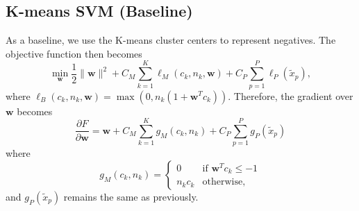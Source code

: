 \documentclass[12pt]{article}
\newcommand{\bw}{\mathbf{w}}
\newcommand{\tx}{\tilde{x}}
\begin{document}
\subsection{K-means SVM (Baseline)}
As a baseline, we use the K-means cluster centers to represent negatives. The objective function then becomes
\begin{equation}
\min_\bw \frac{1}{2}\|\bw \|^2 + C_M\sum_{k = 1}^K \ell_M(c_k, n_k, \bw) + C_P\sum_{p=1}^P \ell_P(\tx_p),
\label{eq:ksvm}
\end{equation}
where $\ell_B(c_k, n_k, \bw) = \max(0, n_k (1  + \bw^Tc_k))$. Therefore, the gradient over $\bw$ becomes
$$
\frac{\partial F}{\partial \bw} = \bw + C_M\sum_{k=1}^K g_M(c_k, n_k) + C_P\sum_{p=1}^P g_P(\tx_p)
$$
where
$$
g_M(c_k, n_k) = 
  \begin{cases}
   0 & \text{if } \bw^Tc_k \le -1  \\
   n_kc_k & \text{otherwise},
  \end{cases}
$$
and $g_P(\tx_p)$ remains the same as previously.



\end{document}
